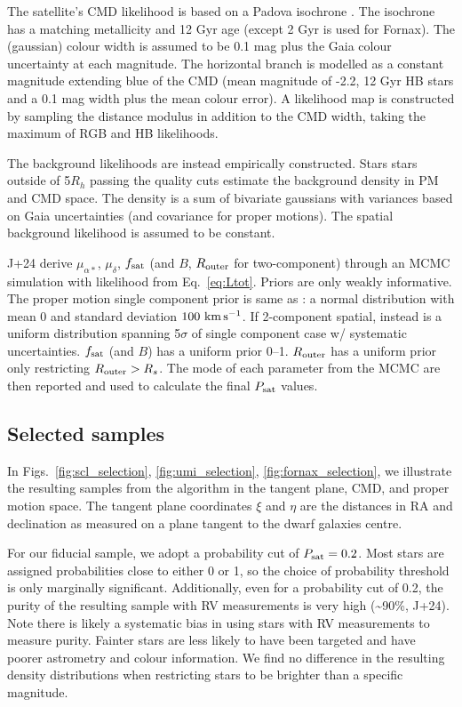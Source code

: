 The satellite's CMD likelihood is based on a Padova isochrone
\citep{girardi+2002}. The isochrone has a matching metallicity and 12
Gyr age (except 2 Gyr is used for Fornax). The (gaussian) colour width
is assumed to be 0.1 mag plus the Gaia colour uncertainty at each
magnitude. The horizontal branch is modelled as a constant magnitude
extending blue of the CMD (mean magnitude of -2.2, 12 Gyr HB stars and a
0.1 mag width plus the mean colour error). A likelihood map is
constructed by sampling the distance modulus in addition to the CMD
width, taking the maximum of RGB and HB likelihoods.

The background likelihoods are instead empirically constructed. Stars
stars outside of 5\(R_h\) passing the quality cuts estimate the
background density in PM and CMD space. The density is a sum of
bivariate gaussians with variances based on Gaia uncertainties (and
covariance for proper motions). The spatial background likelihood is
assumed to be constant.

J+24 derive \(\mu_{\alpha*}\), \(\mu_\delta\), \(f_{\rm sat}\) (and
\(B\), \(R_{\rm outer}\) for two-component) through an MCMC simulation
with likelihood from Eq.~\ref{eq:Ltot}. Priors are only weakly
informative. The proper motion single component prior is same as
\citet{MV2020a}: a normal distribution with mean 0 and standard
deviation \(100\ {\rm km\,s^{-1}}\). If 2-component spatial, instead is a uniform
distribution spanning 5\(\sigma\) of single component case w/ systematic
uncertainties. \(f_{\rm sat}\) (and \(B\)) has a uniform prior 0--1.
\(R_{\rm outer}\) has a uniform prior only restricting
\(R_{\rm outer} > R_s\). The mode of each parameter from the MCMC are
then reported and used to calculate the final \(P_{\rm sat}\) values.

\subsection{Selected samples}\label{selected-samples}

In
Figs.~\ref{fig:scl_selection}, \ref{fig:umi_selection}, \ref{fig:fornax_selection},
we illustrate the resulting samples from the algorithm in the tangent
plane, CMD, and proper motion space. The tangent plane coordinates
\(\xi\) and \(\eta\) are the distances in RA and declination as measured
on a plane tangent to the dwarf galaxies centre.

For our fiducial sample, we adopt a probability cut of
\(P_{\rm sat} = 0.2\). Most stars are assigned probabilities close to
either 0 or 1, so the choice of probability threshold is only marginally
significant. Additionally, even for a probability cut of 0.2, the purity
of the resulting sample with RV measurements is very high
(\textasciitilde90\%, J+24). Note there is likely a systematic bias in
using stars with RV measurements to measure purity. Fainter stars are
less likely to have been targeted and have poorer astrometry and colour
information. We find no difference in the resulting density
distributions when restricting stars to be brighter than a specific
magnitude.

